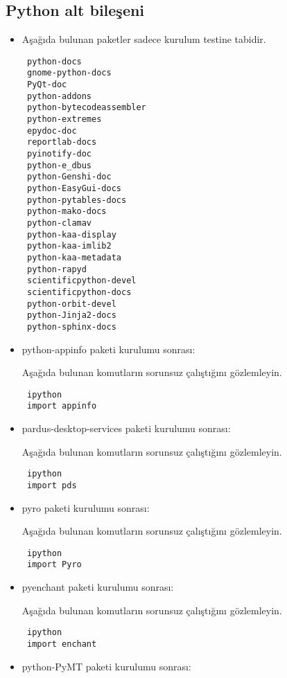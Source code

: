 \documentclass[a4paper,10pt]{article}
\begin{document}
\subsection{Python alt bileşeni}
\begin{itemize}

\item Aşağıda bulunan paketler sadece kurulum testine tabidir.
\begin{verbatim}
 python-docs
 gnome-python-docs
 PyQt-doc
 python-addons
 python-bytecodeassembler
 python-extremes
 epydoc-doc
 reportlab-docs
 pyinotify-doc 
 python-e_dbus
 python-Genshi-doc
 python-EasyGui-docs
 python-pytables-docs
 python-mako-docs
 python-clamav
 python-kaa-display
 python-kaa-imlib2
 python-kaa-metadata
 python-rapyd 
 scientificpython-devel
 scientificpython-docs
 python-orbit-devel
 python-Jinja2-docs
 python-sphinx-docs
\end{verbatim}
\item python-appinfo paketi kurulumu sonrası:

Aşağıda bulunan komutların sorunsuz çalıştığını gözlemleyin.

\begin{verbatim}
 ipython
 import appinfo
\end{verbatim}

\item pardus-desktop-services paketi kurulumu sonrası:

Aşağıda bulunan komutların sorunsuz çalıştığını gözlemleyin.

\begin{verbatim}
 ipython
 import pds
\end{verbatim}

\item pyro paketi kurulumu sonrası:

Aşağıda bulunan komutların sorunsuz çalıştığını gözlemleyin.

\begin{verbatim}
 ipython
 import Pyro
\end{verbatim}

\item pyenchant paketi kurulumu sonrası:

Aşağıda bulunan komutların sorunsuz çalıştığını gözlemleyin.

\begin{verbatim}
 ipython
 import enchant
\end{verbatim}


\item python-PyMT paketi kurulumu sonrası:


\end{itemize}
\end{document}
